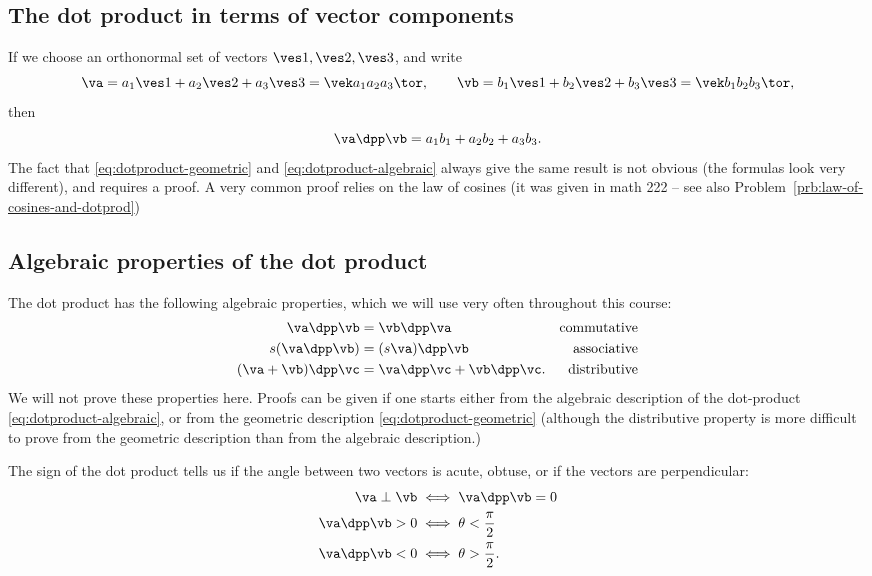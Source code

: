 \subsection{The dot product in terms of vector components}
If we choose an orthonormal set of vectors $\ves1,\ves2,\ves3$, and write
\[
  \va = a_1\ves1+a_2\ves2+a_3\ves3=\vek a_1 \\ a_2 \\ a_3 \tor,\qquad
  \vb = b_1\ves1+b_2\ves2+b_3\ves3=\vek b_1 \\ b_2 \\ b_3 \tor,
\]
then
\begin{equation}
  \label{eq:dotproduct-algebraic}
  \va\dpp\vb = a_1b_1 + a_2b_2 + a_3b_3.
\end{equation}
The fact that \eqref{eq:dotproduct-geometric} and \eqref{eq:dotproduct-algebraic}
always give the same result is not obvious (the formulas look very different), and
requires a proof.  A very common proof relies on the law of cosines (it was given in
math 222 -- see also Problem~\ref{prb:law-of-cosines-and-dotprod})

\subsection{Algebraic properties of the dot product}
\label{sec:dotproduct-algebraic-properties}%
The dot product has the following algebraic properties, which we will
use very often throughout this course:
\begin{align*}
  \va\dpp\vb &= \vb\dpp\va & \text{commutative} \\
  s(\va\dpp\vb) &= (s\va)\dpp\vb & \text{associative} \\
  (\va+\vb)\dpp\vc & = \va\dpp\vc + \vb\dpp\vc. & \text{distributive}
\end{align*}
We will not prove these properties here.  Proofs can be given if one
starts either from the algebraic description of the dot-product
\eqref{eq:dotproduct-algebraic}, or from the geometric description
\eqref{eq:dotproduct-geometric} (although the distributive property is
more difficult to prove from the geometric description than from the
algebraic description.)

The sign of the dot product tells us if the angle between two vectors is acute,
obtuse, or if the vectors are perpendicular:
\begin{subequations}
  \begin{align}
    \va\perp\vb  &\iff \va\dpp\vb=0 \\
    \va\dpp\vb>0 &\iff \theta<\frac{\pi}{2}\\
    \va\dpp\vb<0 &\iff \theta>\frac{\pi}{2}.
  \end{align}
\end{subequations}

